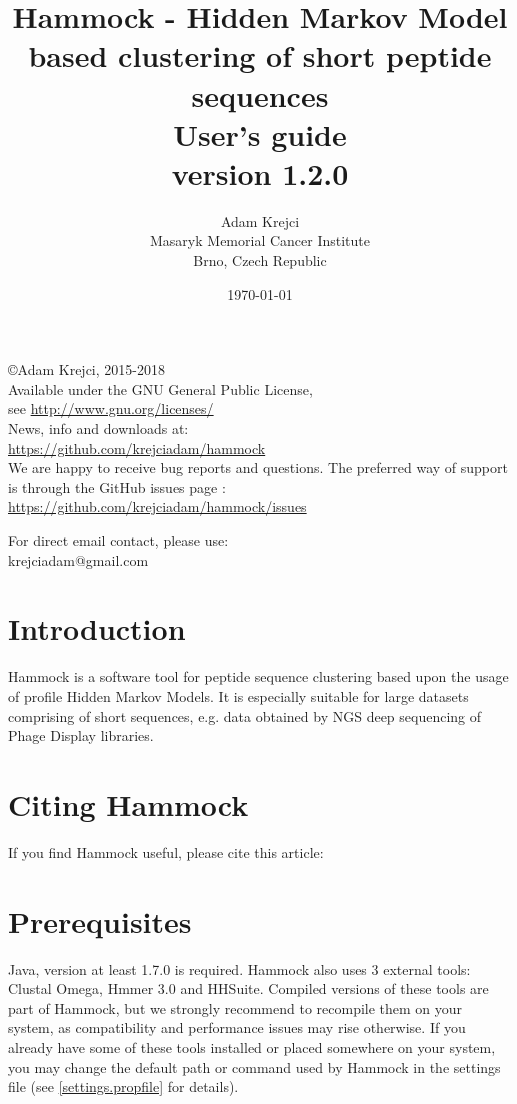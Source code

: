 \documentclass[11pt, a4paper, twoside, titlepage]{article}
\title{Hammock - Hidden Markov Model based clustering of short peptide sequences\\ \vspace{2 mm} {\large User's guide} \\ \vspace{2 mm} {\small version 1.2.0}}
\author{Adam Krejci  \\
	Masaryk Memorial Cancer Institute\\
	Brno, Czech Republic
	}
\date{\today}
\begin{document}
\maketitle

\begin{center}
\copyright Adam Krejci, 2015-2018 \\ \vspace{1cm}
Available under the GNU General Public License, \\
see \url{http://www.gnu.org/licenses/} \\ \vspace{1cm}
News, info and downloads at: \\
\url{https://github.com/krejciadam/hammock} \\ \vspace{1cm}
We are happy to receive bug reports and questions. The preferred way of support is through the GitHub issues page : \\
 \url{https://github.com/krejciadam/hammock/issues}

 For direct email contact, please use: \\
krejciadam@gmail.com
\end{center} 
\newpage



\tableofcontents

\newpage

\section{Introduction}
\label{introduction}
Hammock is a software tool for peptide sequence clustering based upon the usage of profile Hidden Markov Models. It is especially suitable for large datasets comprising of short sequences, e.g. data obtained by NGS deep sequencing of Phage Display libraries.


\section{Citing Hammock}
If you find Hammock useful, please cite this article: \newline




\section{Prerequisites}
\label{prerequisities}
Java, version at least 1.7.0 is required. Hammock also uses 3 external tools: Clustal Omega\cite{Sievers2011}, Hmmer 3.0\citep{Finn2011} and HHSuite\citep{Soding2004}. Compiled versions of these tools are part of Hammock, but we strongly recommend to recompile them on your system, as compatibility and performance issues may rise otherwise. If you already have some of these tools installed or placed somewhere on your system, you may change the default path or command used by Hammock in the settings file (see \ref{settings.propfile} for details). 
\end{document}
